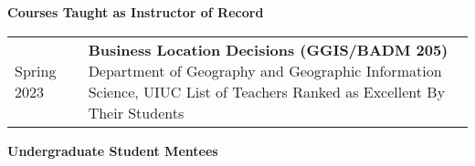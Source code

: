 \documentclass{acmcv}
\begin{document}






    
\vspace*{0.25cm}

    \textbf{Courses Taught as Instructor of Record}
    \vspace*{-0.3cm}

    \begin{longtable}{p{0.16\linewidth} p{0.84\linewidth}}
        Spring 2023 & \textbf{Business Location Decisions (GGIS/BADM 205)} \newline Department of Geography and Geographic Information Science, UIUC \newline
        List of Teachers Ranked as Excellent By Their Students \\

    \end{longtable}
    \textbf{Undergraduate Student Mentees}
    \vspace*{-0.25cm}
\end{document}
